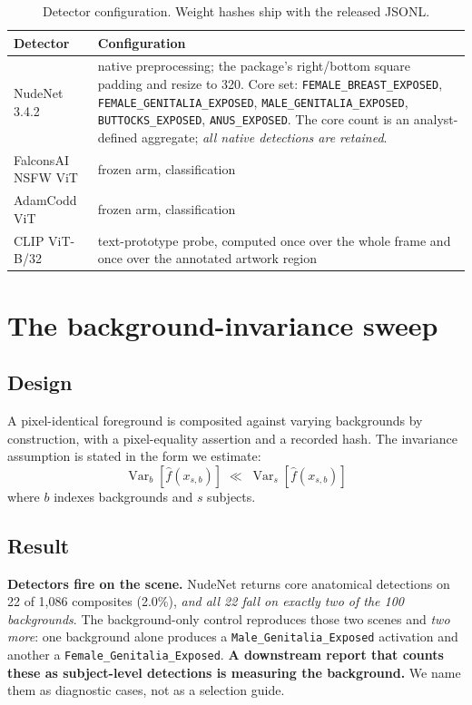 \begin{table}[H]
\centering\small
\begin{tabularx}{\linewidth}{@{}lX@{}}
\toprule
Detector & Configuration \\
\midrule
NudeNet 3.4.2 & native preprocessing; the package's right/bottom square padding and resize to 320. Core set: \texttt{FEMALE\_BREAST\_EXPOSED}, \texttt{FEMALE\_GENITALIA\_EXPOSED}, \texttt{MALE\_GENITALIA\_EXPOSED}, \texttt{BUTTOCKS\_EXPOSED}, \texttt{ANUS\_EXPOSED}. The core count is an analyst-defined aggregate; \emph{all native detections are retained}. \\
FalconsAI NSFW ViT & frozen arm, classification \\
AdamCodd ViT & frozen arm, classification \\
CLIP ViT-B/32 & text-prototype probe, computed once over the whole frame and once over the annotated artwork region \\
\bottomrule
\end{tabularx}
\caption{Detector configuration. Weight hashes ship with the released JSONL.}
\label{tab:detcfg}
\end{table}

\section{The background-invariance sweep}
\label{app:sweep}

\subsection{Design}

A pixel-identical foreground is composited against varying backgrounds by
construction, with a pixel-equality assertion and a recorded hash. The
invariance assumption is stated in the form we estimate:
\begin{equation}
\operatorname{Var}_{b}\!\left[\hat f(x_{s,b})\right]
\;\ll\;
\operatorname{Var}_{s}\!\left[\hat f(x_{s,b})\right]
\end{equation}
where $b$ indexes backgrounds and $s$ subjects.

\subsection{Result}

\textbf{Detectors fire on the scene.} NudeNet returns core anatomical
detections on 22 of 1{,}086 composites (2.0\%), \emph{and all 22 fall on exactly
two of the 100 backgrounds}. The background-only control reproduces those two
scenes and \emph{two more}: one background alone produces a
\texttt{Male\_Genitalia\_Exposed} activation and another a
\texttt{Female\_Genitalia\_Exposed}. \textbf{A downstream report that counts
these as subject-level detections is measuring the background.} We name them
as diagnostic cases, not as a selection guide.

